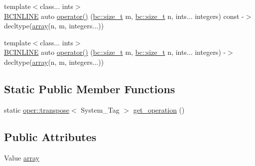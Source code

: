 \begin{DoxyCompactItemize}
\item 
{\footnotesize template$<$class... ints$>$ }\\\hyperlink{common_8h_a6699e8b0449da5c0fafb878e59c1d4b1}{B\+C\+I\+N\+L\+I\+NE} auto \hyperlink{structbc_1_1tensors_1_1exprs_1_1Un__Op_3_01oper_1_1transpose_3_01System__Tag_01_4_00_01Value_01_4_a8ea2ec54a5619d9180e338e31d97562a}{operator()} (\hyperlink{namespacebc_aaf8e3fbf99b04b1b57c4f80c6f55d3c5}{bc\+::size\+\_\+t} m, \hyperlink{namespacebc_aaf8e3fbf99b04b1b57c4f80c6f55d3c5}{bc\+::size\+\_\+t} n, ints... integers) const -\/$>$ decltype(\hyperlink{structbc_1_1tensors_1_1exprs_1_1Un__Op_3_01oper_1_1transpose_3_01System__Tag_01_4_00_01Value_01_4_a0860f3671495a9b2826a4352e810dd97}{array}(n, m, integers...))
\item 
{\footnotesize template$<$class... ints$>$ }\\\hyperlink{common_8h_a6699e8b0449da5c0fafb878e59c1d4b1}{B\+C\+I\+N\+L\+I\+NE} auto \hyperlink{structbc_1_1tensors_1_1exprs_1_1Un__Op_3_01oper_1_1transpose_3_01System__Tag_01_4_00_01Value_01_4_a92c0f5407dffcffda5bd19721b381de3}{operator()} (\hyperlink{namespacebc_aaf8e3fbf99b04b1b57c4f80c6f55d3c5}{bc\+::size\+\_\+t} m, \hyperlink{namespacebc_aaf8e3fbf99b04b1b57c4f80c6f55d3c5}{bc\+::size\+\_\+t} n, ints... integers) -\/$>$ decltype(\hyperlink{structbc_1_1tensors_1_1exprs_1_1Un__Op_3_01oper_1_1transpose_3_01System__Tag_01_4_00_01Value_01_4_a0860f3671495a9b2826a4352e810dd97}{array}(n, m, integers...))
\end{DoxyCompactItemize}
\subsection*{Static Public Member Functions}
\begin{DoxyCompactItemize}
\item 
static \hyperlink{structbc_1_1oper_1_1transpose}{oper\+::transpose}$<$ System\+\_\+\+Tag $>$ \hyperlink{structbc_1_1tensors_1_1exprs_1_1Un__Op_3_01oper_1_1transpose_3_01System__Tag_01_4_00_01Value_01_4_afe053d5280d264d5fa20a79986bb2ac6}{get\+\_\+operation} ()
\end{DoxyCompactItemize}
\subsection*{Public Attributes}
\begin{DoxyCompactItemize}
\item 
Value \hyperlink{structbc_1_1tensors_1_1exprs_1_1Un__Op_3_01oper_1_1transpose_3_01System__Tag_01_4_00_01Value_01_4_a0860f3671495a9b2826a4352e810dd97}{array}
\end{DoxyCompactItemize}
